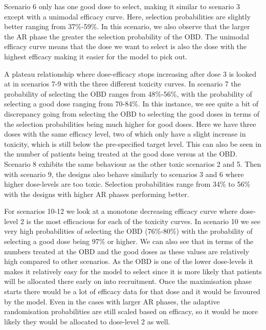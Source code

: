 Scenario 6 only has one good dose to select, making it similar to scenario 3 except with a unimodal efficacy curve. Here, selection probabilities are slightly better ranging from 37\%-59\%. In this scenario, we also observe that the larger the AR phase the greater the selection probability of the OBD. The unimodal efficacy curve means that the dose we want to select is also the dose with the highest efficacy making it easier for the model to pick out. 

A plateau relationship where dose-efficacy stops increasing after dose 3 is looked at in scenarios 7-9 with the three different toxicity curves. In scenario 7 the probability of selecting the OBD ranges from 48\%-56\%, with the probability of selecting a good dose ranging from 70-84\%. In this instance, we see quite a bit of discrepancy going from selecting the OBD to selecting the good doses in terms of the selection probabilities being much higher for good doses. Here we have three doses with the same efficacy level, two of which only have a slight increase in toxicity, which is still below the pre-specified target level. This can also be seen in the number of patients being treated at the good dose versus at the OBD. Scenario 8 exhibits the same behaviour as the other toxic scenarios 2 and 5. Then with scenario 9, the designs also behave similarly to scenarios 3 and 6 where higher dose-levels are too toxic. Selection probabilities range from 34\% to 56\% with the designs with higher AR phases performing better. 

For scenarios 10-12 we look at a monotone decreasing efficacy curve where dose-level 2 is the most efficacious for each of the toxicity curves. In scenario 10 we see very high probabilities of selecting the OBD (76\%-80\%) with the probability of selecting a good dose being 97\% or higher. We can also see that in terms of the numbers treated at the OBD and the good doses as these values are relatively high compared to other scenarios. As the OBD is one of the lower dose-levels it makes it relatively easy for the model to select since it is more likely that patients will be allocated there early on into recruitment. Once the maximisation phase starts there would be a lot of efficacy data for that dose and it would be favoured by the model. Even in the cases with larger AR phases, the adaptive randomisation probabilities are still scaled based on efficacy, so it would be more likely they would be allocated to dose-level 2 as well. 

